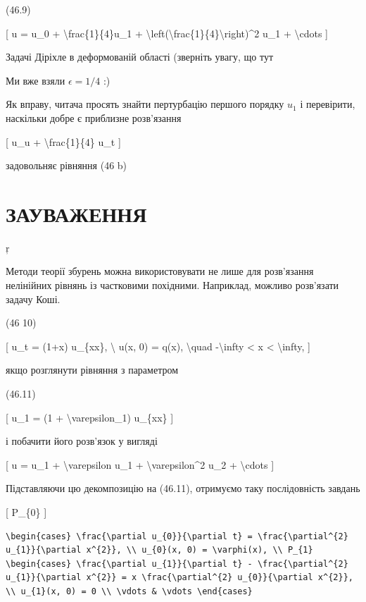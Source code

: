 \documentclass[
]{article}
\begin{document}
(46.9)

{[} u = u\_0 + \textbackslash frac\{1\}\{4\}u\_1 +
\textbackslash left(\textbackslash frac\{1\}\{4\}\textbackslash right)\^{}2
u\_1 + \textbackslash cdots {]}

Задачі Діріхле в деформованій області (зверніть увагу, що тут

Ми вже взяли \(\epsilon = 1/4\) :)

Як вправу, читача просять знайти пертурбацію першого порядку \(u_1\) і
перевірити, наскільки добре є приблизне розв'язання

{[} u\_u + \textbackslash frac\{1\}\{4\} u\_t {]}

задовольняє рівняння (46 b)

\section{ЗАУВАЖЕННЯ}\label{ux437ux430ux443ux432ux430ux436ux435ux43dux43dux44f-7}

ŗ

Методи теорії збурень можна використовувати не лише для розв'язання
нелінійних рівнянь із частковими похідними. Наприклад, можливо
розв'язати задачу Коші.

(46 10)

{[} u\_t = (1+x) u\_\{xx\}, \textbackslash{} u(x, 0) = q(x),
\textbackslash quad -\textbackslash infty \textless{} x \textless{}
\textbackslash infty, {]}

якщо розглянути рівняння з параметром

(46.11)

{[} u\_1 = (1 + \textbackslash varepsilon\_1) u\_\{xx\} {]}

і побачити його розв'язок у вигляді

{[} u = u\_1 + \textbackslash varepsilon u\_1 +
\textbackslash varepsilon\^{}2 u\_2 + \textbackslash cdots {]}

Підставляючи цю декомпозицію на (46.11), отримуємо таку послідовність
завдань

{[} P\_\{0\} {]}

\begin{verbatim}
\begin{cases} \frac{\partial u_{0}}{\partial t} = \frac{\partial^{2} u_{1}}{\partial x^{2}}, \\ u_{0}(x, 0) = \varphi(x), \\ P_{1} \begin{cases} \frac{\partial u_{1}}{\partial t} - \frac{\partial^{2} u_{1}}{\partial x^{2}} = x \frac{\partial^{2} u_{0}}{\partial x^{2}}, \\ u_{1}(x, 0) = 0 \\ \vdots & \vdots \end{cases}
\end{verbatim}
\end{document}

